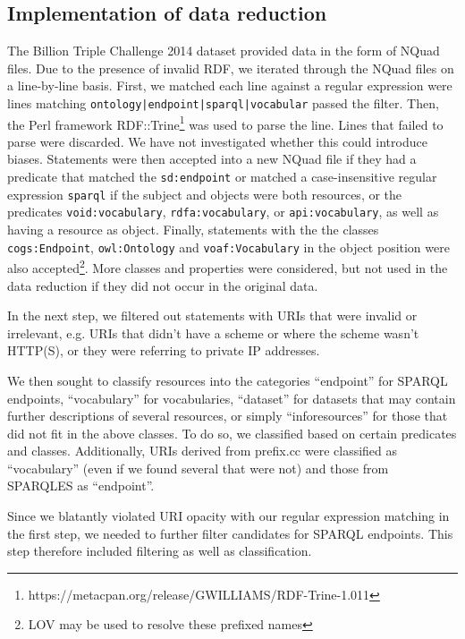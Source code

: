 \documentclass{llncs}
\newcommand{\rdfterm}[1]{\texttt{#1}}
\begin{document}
\begin{subappendices}
\renewcommand{\thesection}{\Alph{section}}%

\section{Implementation of data reduction}\label{app:reduction}

The Billion Triple Challenge 2014 dataset provided data in the form of
NQuad files. Due to the presence of invalid RDF, we iterated through
the NQuad files on a line-by-line basis. First, we matched each line
against a regular expression were lines matching
\texttt{ontology|endpoint|sparql|vocabular} passed the filter. Then,
the Perl framework
RDF::Trine\footnote{https://metacpan.org/release/GWILLIAMS/RDF-Trine-1.011}
was used to parse the line. Lines that failed to parse were
discarded. We have not investigated whether this could introduce
biases. Statements were then accepted into a new NQuad file if they
had a predicate that matched the \rdfterm{sd:endpoint} or matched a
case-insensitive regular expression \texttt{sparql} if the subject and
objects were both resources, or the predicates
\rdfterm{void:vocabulary}, \rdfterm{rdfa:vocabulary}, or
\rdfterm{api:vocabulary}, as well as having a resource as
object. Finally, statements with the the classes
\rdfterm{cogs:Endpoint}, \rdfterm{owl:Ontology} and
\rdfterm{voaf:Vocabulary} in the object position were also
accepted\footnote{LOV may be used to resolve these prefixed
  names}. More classes and properties were considered, but not used in
the data reduction if they did not occur in the original data.

In the next step, we filtered out statements with URIs that were
invalid or irrelevant, e.g. URIs that didn't have a scheme or where
the scheme wasn't HTTP(S), or they were referring to private IP addresses.

We then sought to classify resources into the categories ``endpoint''
for SPARQL endpoints, ``vocabulary'' for vocabularies, ``dataset'' for
datasets that may contain further descriptions of several resources,
or simply ``inforesources'' for those that did not fit in the above
classes. To do so, we classified based on certain predicates and
classes. Additionally, URIs derived from prefix.cc were classified as
``vocabulary'' (even if we found several that were not) and those from
SPARQLES as ``endpoint''.

Since we blatantly violated URI opacity with our regular expression
matching in the first step, we needed to further filter candidates for
SPARQL endpoints. This step therefore included filtering as well as
classification.


\end{subappendices}
\end{document}
